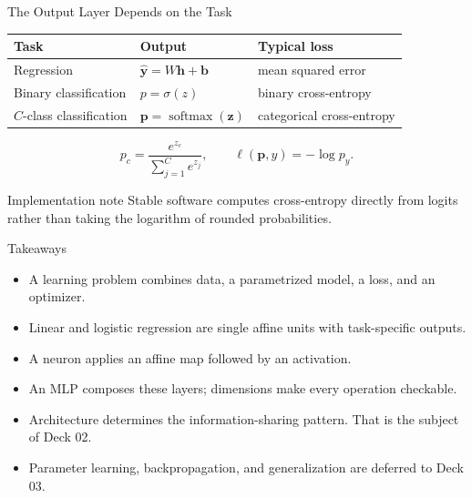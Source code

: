 \documentclass[10pt,aspectratio=169]{ntuabeamer}
\begin{document}
\begin{frame}{The Output Layer Depends on the Task}
  \centering
  \begin{tabular}{lll}
    \toprule
    Task & Output & Typical loss \\
    \midrule
    Regression & $\hat{\mathbf y}=W\mathbf h+\mathbf b$ & mean squared error \\
    Binary classification & $p=\sigma(z)$ & binary cross-entropy \\
    $C$-class classification & $\mathbf p=\operatorname{softmax}(\mathbf z)$ & categorical cross-entropy \\
    \bottomrule
  \end{tabular}
  \vspace{0.45cm}
  \[
    p_c=\frac{e^{z_c}}{\sum_{j=1}^{C}e^{z_j}},
    \qquad
    \ell(\mathbf p,y)=-\log p_y.
  \]
  \begin{block}{Implementation note}
    Stable software computes cross-entropy directly from logits rather than taking the logarithm of rounded probabilities.
  \end{block}
\end{frame}

\begin{frame}{Takeaways}
  \begin{itemize}
    \item A learning problem combines data, a parametrized model, a loss, and an optimizer.
    \item Linear and logistic regression are single affine units with task-specific outputs.
    \item A neuron applies an affine map followed by an activation.
    \item An MLP composes these layers; dimensions make every operation checkable.
    \item Architecture determines the information-sharing pattern. That is the subject of Deck 02.
    \item Parameter learning, backpropagation, and generalization are deferred to Deck 03.
  \end{itemize}
\end{frame}
\end{document}
